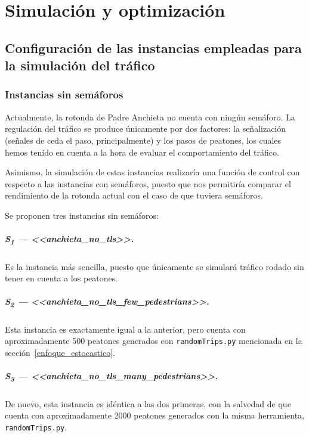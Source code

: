 \chapter{Simulación y optimización}
\label{cap:simulacion}

\section{Configuración de las instancias empleadas para la simulación del tráfico}

\subsection{Instancias sin semáforos}

Actualmente, la rotonda de Padre Anchieta no cuenta con ningún semáforo. La regulación del tráfico se produce únicamente por dos factores: la señalización (señales de ceda el paso, principalmente) y los pasos de peatones, los cuales hemos tenido en cuenta a la hora de evaluar el comportamiento del tráfico.

Asimismo, la simulación de estas instancias realizaría una función de control con respecto a las instancias con semáforos, puesto que nos permitiría comparar el rendimiento de la rotonda actual con el caso de que tuviera semáforos.

Se proponen tres instancias sin semáforos:

\paragraph{S\textsubscript{1} --- <<anchieta\_no\_tls>>.} Es la instancia más sencilla, puesto que únicamente se simulará tráfico rodado sin tener en cuenta a los peatones.


\paragraph{S\textsubscript{2} --- <<anchieta\_no\_tls\_few\_pedestrians>>.} Esta instancia es exactamente igual a la anterior, pero cuenta con aproximadamente 500 peatones generados con \texttt{randomTrips.py} mencionada en la sección~\ref{enfoque_estocastico}.


\paragraph{S\textsubscript{3} --- <<anchieta\_no\_tls\_many\_pedestrians>>.} De nuevo, esta instancia es idéntica a las dos primeras, con la salvedad de que cuenta con aproximadamente 2000 peatones generados con la misma herramienta, \texttt{randomTrips.py}.



